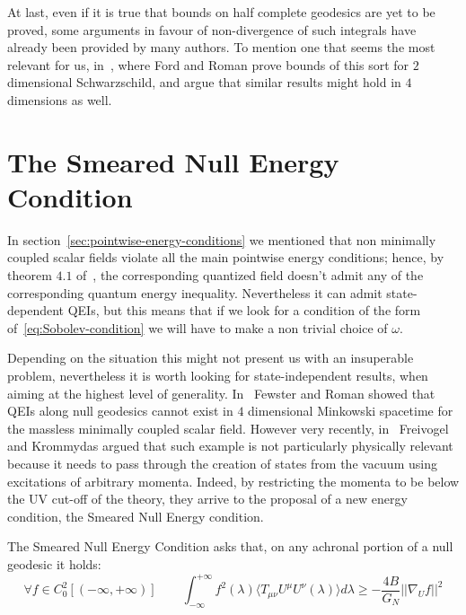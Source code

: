 At last, even if it is true that bounds on half complete geodesics are yet to be proved, some arguments in favour of non-divergence of such integrals have already been provided by many authors. To mention one that seems the most relevant for us, in~\cite[]{ford1996averaged}, where Ford and Roman prove bounds of this sort for \(2\) dimensional Schwarzschild, and argue that similar results might hold in \(4\) dimensions as well.

\section{The Smeared Null Energy Condition}
\label{sec:SNEC}

In section~\ref{sec:pointwise-energy-conditions} we mentioned that non minimally coupled scalar fields violate all the main pointwise energy conditions; hence, by theorem \(4.1\) of~\cite[]{kontou2020energy}, the corresponding quantized field doesn't admit any of the corresponding quantum energy inequality. Nevertheless it can admit state-dependent QEIs, but this means that if we look for a condition of the form of~\eqref{eq:Sobolev-condition} we will have to make a non trivial choice of \(\omega\).

Depending on the situation this might not present us with an insuperable problem, nevertheless it is worth looking for state-independent results, when aiming at the highest level of generality.
In~\cite[]{fewster2003null} Fewster and Roman showed that QEIs along null geodesics cannot exist in \(4\) dimensional Minkowski spacetime for the massless minimally coupled scalar field. However very recently, in~\cite[]{freivogel2018smeared} Freivogel and Krommydas argued that such example is not particularly physically relevant because it needs to pass through the creation of states from the vacuum using excitations of arbitrary momenta. Indeed, by restricting the momenta to be below the UV cut-off of the theory, they arrive to the proposal of a new energy condition, the Smeared Null Energy condition.

\begin{definition}
	The Smeared Null Energy Condition asks that, on any achronal portion of a null geodesic it holds:
	\begin{equation}
		\label{eq:SNEC}
		\forall f \in C_0^2[(-\infty, +\infty)] \quad\quad \int_{-\infty}^{+\infty} f^2(\lambda)\langle T_{\mu\nu}U^{\mu}U^{\nu}(\lambda) \rangle d\lambda \ge -\frac{4B}{G_N}\vert\vert \nabla_U f\vert\vert^2
	\end{equation}
\end{definition}


